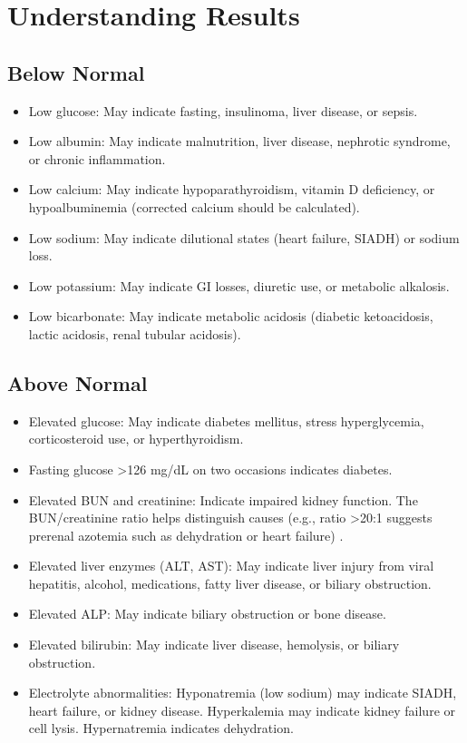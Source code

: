 \section*{Understanding Results}

\subsection*{Below Normal}
\begin{itemize}
  \item Low glucose: May indicate fasting, insulinoma, liver disease, or sepsis.
  \item Low albumin: May indicate malnutrition, liver disease, nephrotic syndrome, or chronic inflammation.
  \item Low calcium: May indicate hypoparathyroidism, vitamin D deficiency, or hypoalbuminemia (corrected calcium should be calculated).
  \item Low sodium: May indicate dilutional states (heart failure, SIADH) or sodium loss.
  \item Low potassium: May indicate GI losses, diuretic use, or metabolic alkalosis.
  \item Low bicarbonate: May indicate metabolic acidosis (diabetic ketoacidosis, lactic acidosis, renal tubular acidosis).
\end{itemize}

\subsection*{Above Normal}
\begin{itemize}
  \item Elevated glucose: May indicate diabetes mellitus, stress hyperglycemia, corticosteroid use, or hyperthyroidism.
  \item Fasting glucose >126 mg/dL on two occasions indicates diabetes.
  \item Elevated BUN and creatinine: Indicate impaired kidney function. The BUN/creatinine ratio helps distinguish causes (e.g., ratio >20:1 suggests prerenal azotemia such as dehydration or heart failure) \cite{fischbach2023manual}.
  \item Elevated liver enzymes (ALT, AST): May indicate liver injury from viral hepatitis, alcohol, medications, fatty liver disease, or biliary obstruction.
  \item Elevated ALP: May indicate biliary obstruction or bone disease.
  \item Elevated bilirubin: May indicate liver disease, hemolysis, or biliary obstruction.
  \item Electrolyte abnormalities: Hyponatremia (low sodium) may indicate SIADH, heart failure, or kidney disease. Hyperkalemia may indicate kidney failure or cell lysis. Hypernatremia indicates dehydration.
\end{itemize}

